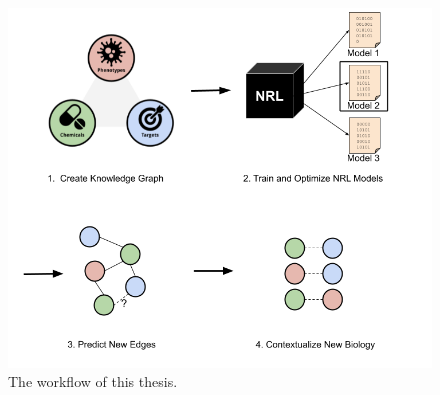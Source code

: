 \begin{figure}[!ht]
    \centering
    \includegraphics[scale=0.60]
    {figures/workflow.png}
    \captionsetup{justification=centering}
    \caption{\label{fig:workflow} The workflow of this thesis.}
\end{figure}
